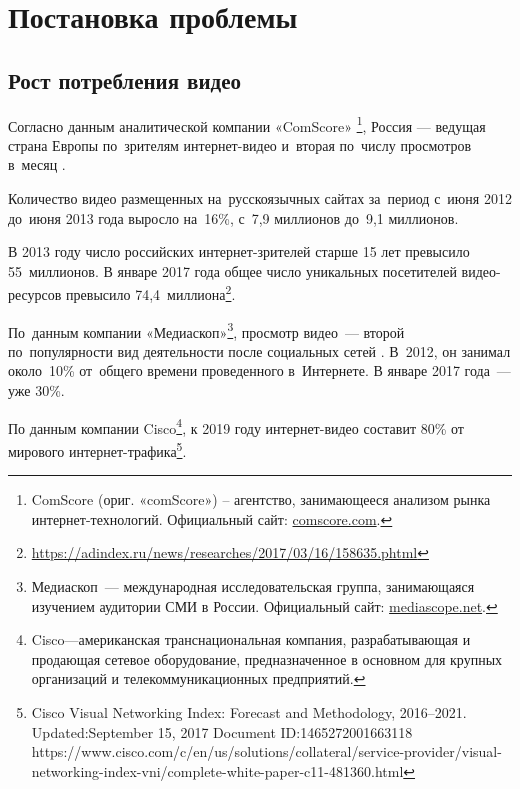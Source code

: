 \documentclass{.local/lib/classes/ndvr-super-article-standalone}
\begin{document}
    \section{Постановка проблемы}


    \subsection{Рост потребления видео}

    Согласно данным аналитической компании «ComScore»
    \footnote{
        ComScore (ориг. «comScore») – 
        агентство, занимающееся анализом рынка интернет-технологий.
        Официальный сайт: \href{http://comScore.com}{comscore.com}.
    },
    Россия — ведущая страна Европы по~зрителям интернет-видео
    и~вторая по~числу просмотров в~месяц \cite{Henni:2013}.

    Количество видео размещенных на~русскоязычных
    сайтах за~период с~июня 2012 до~июня 2013 года выросло
    на~16\%, с~7,9 миллионов до~9,1 миллионов.

    В 2013 году число российских интернет-зрителей 
    старше 15 лет превысило 55~миллионов\cite{Onishenko:2013}. 
    В январе 2017 года общее число уникальных 
    посетителей видео-ресурсов превысило 74,4~миллиона\footnote{
        \href{https://adindex.ru/news/researches/2017/03/16/158635.phtml}
        {https://adindex.ru/news/researches/2017/03/16/158635.phtml}  
    }.

    По~данным компании «Медиаскоп»\footnote{
        Медиаскоп~— международная исследовательская группа,
        занимающаяся изучением аудитории СМИ в России.
        Официальный сайт: \href{http://mediascope.net}{mediascope.net}.
    },
    просмотр видео~— второй по~популярности
    вид деятельности после социальных сетей \cite{Henni:2013}.
    В~2012, он занимал около~10\% от~общего 
    времени проведенного в~Интернете. 
    В январе 2017 года~— уже 30\%.


    По данным компании Cisco\footnote{
        Cisco—американская транснациональная компания, разрабатывающая и продающая сетевое оборудование, предназначенное в основном для крупных организаций и телекоммуникационных предприятий.
    }, к 2019 году интернет-видео составит 80\% 
    от мирового интернет-трафика\footnote{
        Cisco Visual Networking Index: 
        Forecast and Methodology, 2016–2021.
        Updated:September 15, 2017
        Document ID:1465272001663118
        https://www.cisco.com/c/en/us/solutions/collateral/service-provider/visual-networking-index-vni/complete-white-paper-c11-481360.html
    }.
\end{document}
